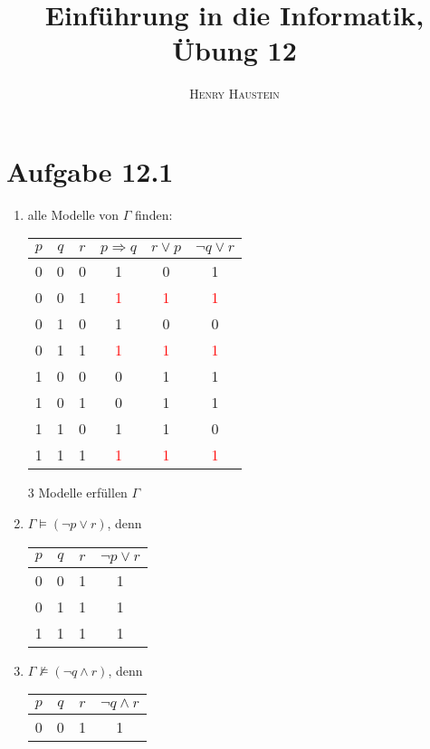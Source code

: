 \documentclass{article}
\title{\textbf{Einführung in die Informatik, Übung 12}}
\author{\textsc{Henry Haustein}}
\date{}
\begin{document}
	\maketitle
	
	\section*{Aufgabe 12.1}
	
	\begin{enumerate}[label=(\alph*)]
		\item alle Modelle von $\Gamma$ finden:
		\begin{center}
			\begin{tabular}{ccc||c|c|c}
				$p$ & $q$ & $r$ & $p\Rightarrow q$ & $r\lor p$ & $\neg q\lor r$ \\
				\hline
				0 & 0 & 0 & 1 & 0 & 1 \\
				0 & 0 & 1 & \textcolor{red}{1} & \textcolor{red}{1} & \textcolor{red}{1} \\
				0 & 1 & 0 & 1 & 0 & 0 \\
				0 & 1 & 1 & \textcolor{red}{1} & \textcolor{red}{1} & \textcolor{red}{1} \\
				1 & 0 & 0 & 0 & 1 & 1 \\
				1 & 0 & 1 & 0 & 1 & 1 \\
				1 & 1 & 0 & 1 & 1 & 0 \\
				1 & 1 & 1 & \textcolor{red}{1} & \textcolor{red}{1} & \textcolor{red}{1} \\
			\end{tabular}
		\end{center}
		3 Modelle erfüllen $\Gamma$
		\item $\Gamma\models (\neg p\lor r)$, denn
		\begin{center}
			\begin{tabular}{ccc||c}
				$p$ & $q$ & $r$ & $\neg p\lor r$ \\
				\hline
				0 & 0 & 1 & 1 \\
				0 & 1 & 1 & 1 \\
				1 & 1 & 1 & 1 \\
			\end{tabular}
		\end{center}
		\item $\Gamma\not\models (\neg q\land r)$, denn
		\begin{center}
			\begin{tabular}{ccc||c}
				$p$ & $q$ & $r$ & $\neg q\land r$ \\
				\hline
				0 & 0 & 1 & 1 \\

\end{tabular}
\end{center}
\end{enumerate}
\end{document}
